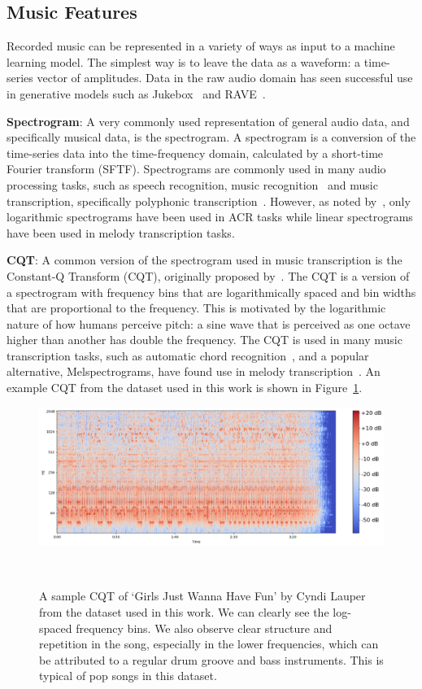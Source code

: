 \subsection{Music Features}\label{sec:background-features}

Recorded music can be represented in a variety of ways as input to a machine learning model. The simplest way is to leave the data as a waveform: a time-series vector of amplitudes. Data in the raw audio domain has seen successful use in generative models such as Jukebox~\citep{Jukebox} and RAVE~\citep{RAVE}.

\textbf{Spectrogram}: A very commonly used representation of general audio data, and specifically musical data, is the spectrogram. A spectrogram is a conversion of the time-series data into the time-frequency domain, calculated by a short-time Fourier transform (SFTF). Spectrograms are commonly used in many audio processing tasks, such as speech recognition, music recognition~\citep{ShazamSpectrogram} and music transcription, specifically polyphonic transcription~\citep{PianoTranscriptionWithTransformer}. However, as noted by~\citet{20YearsofACR}, only logarithmic spectrograms have been used in ACR tasks while linear spectrograms have been used in melody transcription tasks.

\textbf{CQT}: A common version of the spectrogram used in music transcription is the Constant-Q Transform (CQT), originally proposed by~\citet{CQT}. The CQT is a version of a spectrogram with frequency bins that are logarithmically spaced and bin widths that are proportional to the frequency. This is motivated by the logarithmic nature of how humans perceive pitch: a sine wave that is perceived as one octave higher than another has double the frequency. The CQT is used in many music transcription tasks, such as automatic chord recognition~\citep{FirstDeepLearningCQT}, and a popular alternative, Melspectrograms, have found use in melody transcription~\citep{PianoTranscriptionWithTransformer}. An example CQT from the dataset used in this work is shown in Figure~\ref{fig:cqt_example}.

\begin{figure}[H]
    \centering
    \includegraphics[width=1\textwidth]{figures/sample_cqt.png}
    \caption{A sample CQT of `Girls Just Wanna Have Fun' by Cyndi Lauper from the dataset used in this work. We can clearly see the log-spaced frequency bins. We also observe clear structure and repetition in the song, especially in the lower frequencies, which can be attributed to a regular drum groove and bass instruments. This is typical of pop songs in this dataset.}~\label{fig:cqt_example}
\end{figure}


